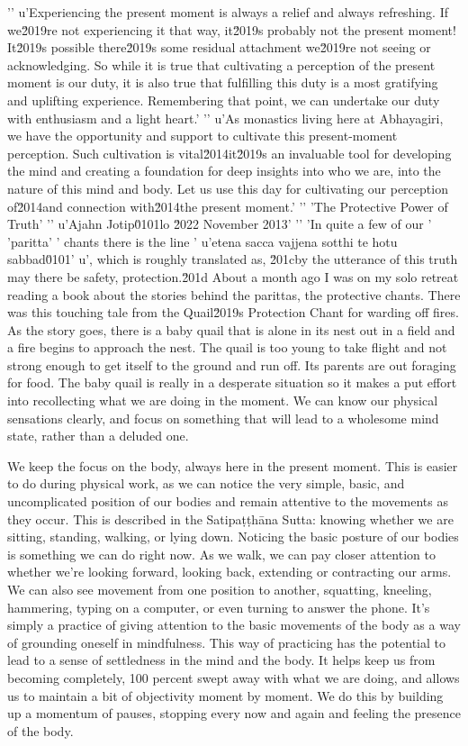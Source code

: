 '\n'
u'Experiencing the present moment is always a relief and always refreshing. If we\u2019re not experiencing it that way, it\u2019s probably not the present moment! It\u2019s possible there\u2019s some residual attachment we\u2019re not seeing or acknowledging. So while it is true that cultivating a perception of the present moment is our duty, it is also true that fulfilling this duty is a most gratifying and uplifting experience. Remembering that point, we can undertake our duty with enthusiasm and a light heart.'
'\n'
u'As monastics living here at Abhayagiri, we have the opportunity and support to cultivate this present-moment perception. Such cultivation is vital\u2014it\u2019s an invaluable tool for developing the mind and creating a foundation for deep insights into who we are, into the nature of this mind and body. Let us use this day for cultivating our perception of\u2014and connection with\u2014the present moment.'
'\n'
'The Protective Power of Truth'
'\n'
u'Ajahn Jotip\u0101lo \u2022 November 2013'
'\n'
'In quite a few of our '
'paritta'
' chants there is the line '
u'etena sacca vajjena sotthi te hotu sabbad\u0101'
u', which is roughly translated as, \u201cby the utterance of this truth may there be safety, protection.\u201d About a month ago I was on my solo retreat reading a book about the stories behind the parittas, the protective chants. There was this touching tale from the Quail\u2019s Protection Chant for warding off fires. As the story goes, there is a baby quail that is alone in its nest out in a field and a fire begins to approach the nest. The quail is too young to take flight and not strong enough to get itself to the ground and run off. Its parents are out foraging for food. The baby quail is really in a desperate situation so it makes a  put effort into recollecting what we are doing in the moment. 
We can know our physical sensations clearly, and focus on something 
that will lead to a wholesome mind state, rather than a deluded one.

We keep the focus on the body, always here in the present moment. This 
is easier to do during physical work, as we can notice the very simple, 
basic, and uncomplicated position of our bodies and remain attentive to 
the movements as they occur. This is described in the Satipaṭṭhāna 
Sutta: knowing whether we are sitting, standing, walking, or lying 
down. Noticing the basic posture of our bodies is something we can do 
right now. As we walk, we can pay closer attention to whether we're 
looking forward, looking back, extending or contracting our arms. We 
can also see movement from one position to another, squatting, 
kneeling, hammering, typing on a computer, or even turning to answer 
the phone. It's simply a practice of giving attention to the basic 
movements of the body as a way of grounding oneself in mindfulness. 
This way of practicing has the potential to lead to a sense of 
settledness in the mind and the body. It helps keep us from becoming 
completely, 100 percent swept away with what we are doing, and allows 
us to maintain a bit of objectivity moment by moment. We do this by 
building up a momentum of pauses, stopping every now and again and 
feeling the presence of the body.

